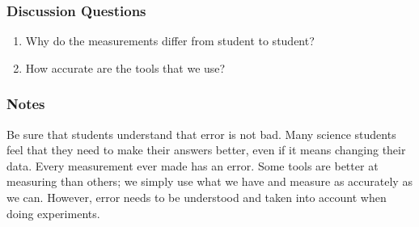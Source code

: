 \subsubsection*{Discussion Questions}
\begin{enumerate}
\item{Why do the measurements differ from student to student?}
\item{How accurate are the tools that we use?}
\end{enumerate}

\subsubsection*{Notes}
Be sure that students understand that error is not bad. Many science students feel that they need to make their answers better, even if it means changing their data. Every measurement ever made has an error. Some tools are better at measuring than others; we simply use what we have and measure as accurately as we can. However, error needs to be understood and taken into account when doing experiments.






